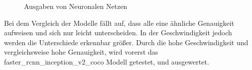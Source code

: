 \documentclass[a4paper,12pt,oneside]{article}
\begin{document}
\begin{figure} 
	[h]
	\centering
    \label{img:Mask} 
    \label{img:Boxes} 
\caption{Ausgaben von Neuronalen Netzen} 
\end{figure} 

\newpage

Bei dem Vergleich der Modelle fällt auf, dass alle eine ähnliche Genauigkeit aufweisen und sich nur leicht unterscheiden. In der Geschwindigkeit jedoch werden die Unterschiede erkennbar größer. Durch die hohe Geschwindigkeit und vergleichsweise hohe Genauigkeit, wird vorerst das faster\_rcnn\_inception\_v2\_coco Modell getestet, und ausgewertet.
\\
\end{document}
